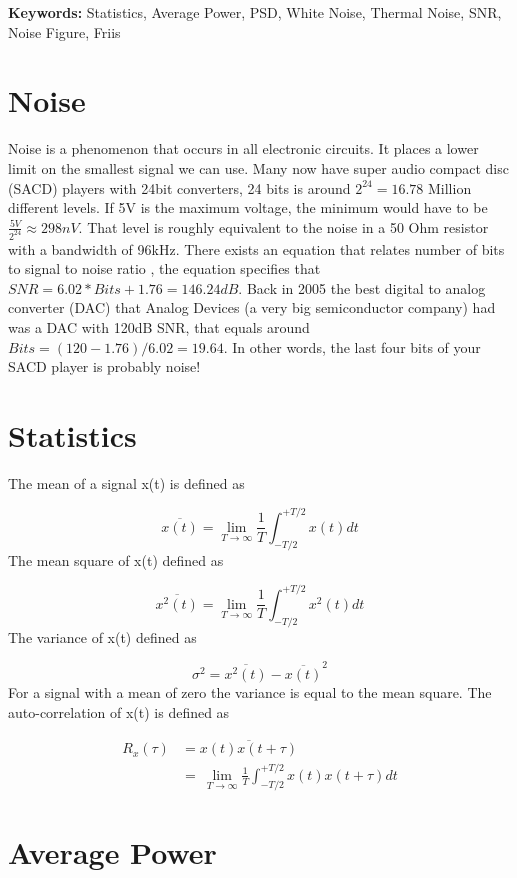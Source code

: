 \textbf{Keywords:} Statistics, Average Power, PSD, White Noise, Thermal
Noise, SNR, Noise Figure, Friis

\section{Noise}\label{noise}

Noise is a phenomenon that occurs in all electronic circuits. It places
a lower limit on the smallest signal we can use. Many now have super
audio compact disc (SACD) players with 24bit converters, 24 bits is
around \(2^{24} = 16.78\) Million different levels. If 5V is the maximum
voltage, the minimum would have to be
\(\frac{5V}{2^{24}} \approx 298nV\). That level is roughly equivalent to
the noise in a 50 Ohm resistor with a bandwidth of 96kHz. There exists
an equation that relates number of bits to signal to noise ratio
, the equation specifies that
\(SNR = 6.02*Bits +
1.76 = 146.24dB\). Back in 2005 the best digital to analog converter
(DAC) that Analog Devices (a very big semiconductor company) had was a
DAC with 120dB SNR, that equals around \(Bits = (120-1.76)/6.02 =
19.64\). In other words, the last four bits of your SACD player is
probably noise!

\section{Statistics}\label{statistics}

The mean of a signal x(t) is defined as

\[\overline{x(t)} = \lim_{T\to\infty} \frac{1}{T}\int^{+T/2}_{-T/2}{ x(t) dt} \tag{1}\]
The mean square of x(t) defined as

\[\overline{x^2(t)} =\lim_{T\to\infty} \frac{1}{T}\int^{+T/2}_{-T/2}{ x^2(t) dt} \tag{2}\]
The variance of x(t) defined as

\[\sigma^2 = \overline{x^2(t)} - \overline{x(t)}^2 \tag{3}\] For a
signal with a mean of zero the variance is equal to the mean square. The
auto-correlation of x(t) is defined as

\[\begin{aligned}
  R_x(\tau ) &= \overline{x(t)x(t + \tau)} \\
&= \: \lim_{T\to\infty} \frac{1}{T}\int^{+T/2}_{-T/2}{ x(t)x(t+\tau) dt}
\end{aligned}\]

\section{Average Power}\label{average-power}

